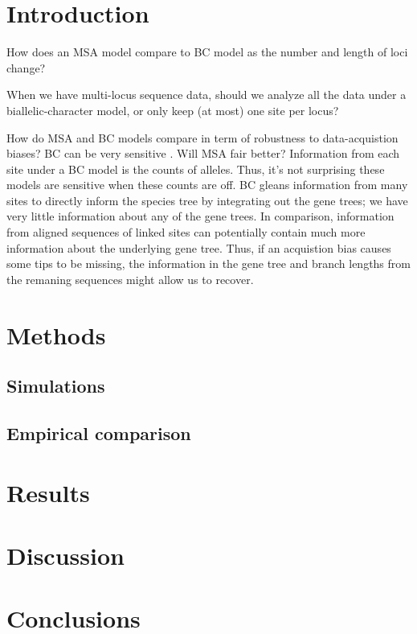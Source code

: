 \section{Introduction}

How does an MSA model compare to BC model as the number and length of loci
change?

When we have multi-locus sequence data, should we analyze all the data under
a biallelic-character model, or only keep (at most) one site per locus?

How do MSA and BC models compare in term of robustness to data-acquistion
biases?
BC can be very sensitive \citep{Oaks2018ecoevolity}.
Will MSA fair better?
Information from each site under a BC model is the counts of alleles.
Thus, it's not surprising these models are sensitive when these counts are off.
BC gleans information from many sites to directly inform the species
tree by integrating out the gene trees; we have very little information
about any of the gene trees.
In comparison, information from aligned sequences of linked sites can
potentially contain much more information about the underlying gene tree.
Thus, if an acquistion bias causes some tips to be missing, the
information in the gene tree and branch lengths from the remaning
sequences might allow us to recover.



\section{Methods}

\subsection{Simulations}

\subsection{Empirical comparison}


\section{Results}


\section{Discussion}


\section{Conclusions}
